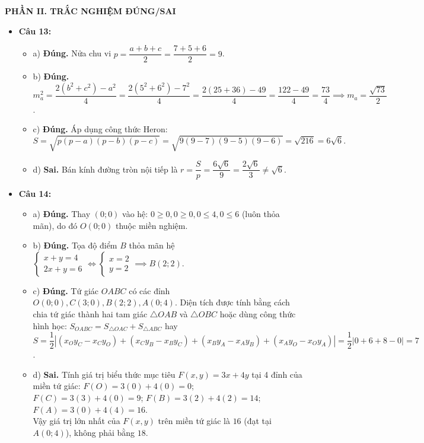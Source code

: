\documentclass[12pt,a4paper]{article}
\begin{document}
\vspace{0.2cm}
\textbf{PHẦN II. TRẮC NGHIỆM ĐÚNG/SAI}
\begin{itemize}[leftmargin=0.6cm]
    \item \textbf{Câu 13:}
    \begin{itemize}
        \item a) \textbf{Đúng.} Nửa chu vi $p = \dfrac{a + b + c}{2} = \dfrac{7 + 5 + 6}{2} = 9$.
        \item b) \textbf{Đúng.} $m_a^2 = \dfrac{2(b^2 + c^2) - a^2}{4} = \dfrac{2(5^2 + 6^2) - 7^2}{4} = \dfrac{2(25 + 36) - 49}{4} = \dfrac{122 - 49}{4} = \dfrac{73}{4} \implies m_a = \dfrac{\sqrt{73}}{2}$.
        \item c) \textbf{Đúng.} Áp dụng công thức Heron:
        \[ S = \sqrt{p(p-a)(p-b)(p-c)} = \sqrt{9(9-7)(9-5)(9-6)} = \sqrt{216} = 6\sqrt{6}. \]
        \item d) \textbf{Sai.} Bán kính đường tròn nội tiếp là $r = \dfrac{S}{p} = \dfrac{6\sqrt{6}}{9} = \dfrac{2\sqrt{6}}{3} \ne \sqrt{6}$.
    \end{itemize}

    \item \textbf{Câu 14:}
    \begin{itemize}
        \item a) \textbf{Đúng.} Thay $(0; 0)$ vào hệ: $0 \ge 0, 0 \ge 0, 0 \le 4, 0 \le 6$ (luôn thỏa mãn), do đó $O(0; 0)$ thuộc miền nghiệm.
        \item b) \textbf{Đúng.} Tọa độ điểm $B$ thỏa mãn hệ $\begin{cases} x + y = 4 \\ 2x + y = 6 \end{cases} \iff \begin{cases} x = 2 \\ y = 2 \end{cases} \implies B(2; 2)$.
        \item c) \textbf{Đúng.} Tứ giác $OABC$ có các đỉnh $O(0; 0), C(3; 0), B(2; 2), A(0; 4)$. Diện tích được tính bằng cách chia tứ giác thành hai tam giác $\triangle OAB$ và $\triangle OBC$ hoặc dùng công thức hình học:
        $S_{OABC} = S_{\triangle OAC} + S_{\triangle ABC}$ hay $S = \dfrac{1}{2}|(x_O y_C - x_C y_O) + (x_C y_B - x_B y_C) + (x_B y_A - x_A y_B) + (x_A y_O - x_O y_A)| = \dfrac{1}{2}|0 + 6 + 8 - 0| = 7$.
        \item d) \textbf{Sai.} Tính giá trị biểu thức mục tiêu $F(x, y) = 3x + 4y$ tại 4 đỉnh của miền tứ giác:
        $F(O) = 3(0) + 4(0) = 0$; $F(C) = 3(3) + 4(0) = 9$; $F(B) = 3(2) + 4(2) = 14$; $F(A) = 3(0) + 4(4) = 16$.\\
        Vậy giá trị lớn nhất của $F(x, y)$ trên miền tứ giác là $16$ (đạt tại $A(0; 4)$), không phải bằng $18$.
    \end{itemize}
\end{itemize}
\end{document}
